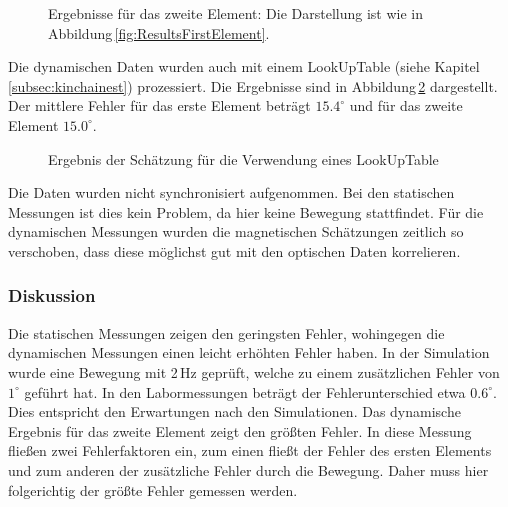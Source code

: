   \begin{figure}[h]
    \centering
    \vspace{0.1mm}
    \caption{Ergebnisse für das zweite Element: Die Darstellung ist wie in Abbildung\,\ref{fig:ResultsFirstElement}.}
    \label{fig:ResultsSecondElement}
  \end{figure}
Die dynamischen Daten wurden auch mit einem LookUpTable (siehe Kapitel\,\ref{subsec:kinchainest}) prozessiert. Die Ergebnisse sind in Abbildung\,\ref{fig:AngelResultLookUp} dargestellt. Der mittlere Fehler für das erste Element beträgt $15.4^\circ$ und für das zweite Element $15.0^\circ$.

  \begin{figure}[h]
    \centering
    \caption{Ergebnis der Schätzung für die Verwendung eines LookUpTable }
    \label{fig:AngelResultLookUp}
  \end{figure}

Die Daten wurden nicht synchronisiert aufgenommen. Bei den statischen Messungen ist dies kein Problem, da hier keine Bewegung stattfindet. Für die dynamischen Messungen wurden die magnetischen Schätzungen zeitlich so verschoben, dass diese möglichst gut mit den optischen Daten korrelieren.
\subsubsection{Diskussion}

Die statischen Messungen zeigen den geringsten Fehler, wohingegen die dynamischen Messungen einen leicht erhöhten Fehler haben. In der Simulation wurde eine Bewegung mit 2\,Hz geprüft, welche zu einem zusätzlichen Fehler von $1^\circ$ geführt hat. In den Labormessungen beträgt der Fehlerunterschied etwa $0.6^\circ$. Dies entspricht den Erwartungen nach den Simulationen. Das dynamische Ergebnis für das zweite Element zeigt den größten Fehler. In diese Messung fließen zwei Fehlerfaktoren ein, zum einen fließt der Fehler des ersten Elements und zum anderen der zusätzliche Fehler durch die Bewegung. Daher muss hier folgerichtig der größte Fehler gemessen werden. 

